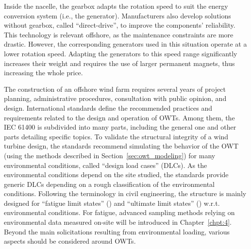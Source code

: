 Inside the nacelle, the gearbox adapts the rotation speed to suit the energy conversion system (i.e., the generator). 
Manufacturers also develop solutions without gearbox, called ``direct-drive'', to improve the components' reliability. 
This technology is relevant offshore, as the maintenance constraints are more drastic. 
However, the corresponding generators used in this situation operate at a lower rotation speed. 
Adapting the generators to this speed range significantly increases their weight and requires the use of larger permanent magnets, thus increasing the whole price.   

The construction of an offshore wind farm requires several years of project planning, administrative procedures, consultation with public opinion, and design. 
International standards define the recommended practices and requirements related to the design and operation of OWTs. 
Among them, the IEC 61400 is subdivided into many parts, including the general one \citep{iec_2019} and other parts detailing specific topics.       
To validate the structural integrity of a wind turbine design, the standards recommend simulating the behavior of the OWT (using the methods described in Section~\ref{sec:owt_modeling}) for many environmental conditions, called ``design load cases'' (DLCs). 
As the environmental conditions depend on the site studied, the standards provide generic DLCs depending on a rough classification of the environmental conditions. 
Following the terminology in civil engineering, the structure is mainly designed for ``fatigue limit states'' () and ``ultimate limit states'' () w.r.t. environmental conditions. 
For fatigue, advanced sampling methods relying on environmental data measured on-site will be introduced in Chapter~\ref{chpt:4}. 
Beyond the main solicitations resulting from environmental loading, various aspects should be considered around OWTs. 

